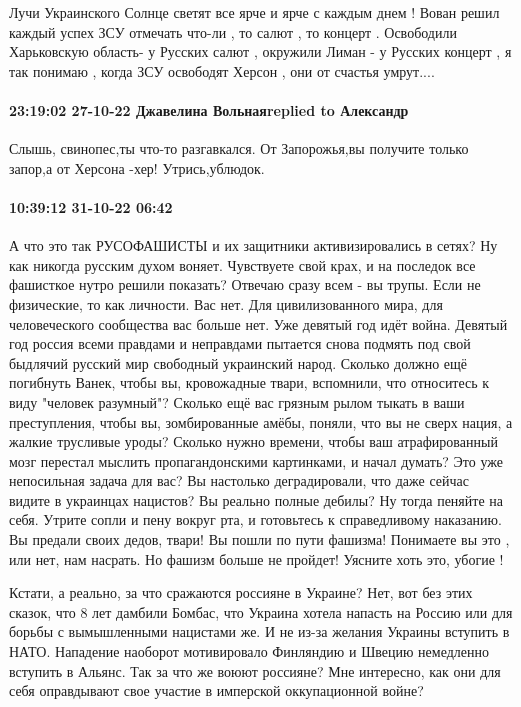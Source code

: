 Лучи Украинского  Солнце   светят все ярче и ярче с каждым днем ! Вован решил
каждый успех ЗСУ отмечать что-ли , то салют , то концерт . Освободили
Харьковскую область- у Русских  салют , окружили Лиман - у Русских  концерт , я
так понимаю ,  когда ЗСУ освободят Херсон , они от счастья умрут....

\paragraph{23:19:02 27-10-22 Джавелина Вольнаяreplied to Александр}

Слышь, свинопес,ты что-то разгавкался. От Запорожья,вы получите только запор,а
от Херсона -хер! Утрись,ублюдок.

\paragraph{10:39:12 31-10-22 06:42}

А что это так РУСОФАШИСТЫ и их защитники активизировались в сетях?
Ну как никогда русским духом воняет. Чувствуете свой крах, и на последок все фашисткое нутро решили показать?
Отвечаю сразу всем - вы трупы. Если не физические, то как личности. Вас нет.
Для цивилизованного мира, для человеческого сообщества вас больше нет.
Уже девятый год идёт война. Девятый год россия всеми правдами и неправдами пытается снова подмять под свой быдлячий русский мир свободный украинский народ.
Сколько должно ещё погибнуть Ванек, чтобы вы, кровожадные твари, вспомнили, что относитесь к виду "человек разумный"?
Сколько ещё вас грязным рылом тыкать в ваши преступления, чтобы вы, зомбированные амёбы, поняли, что вы не сверх нация, а жалкие трусливые уроды?
Сколько нужно времени, чтобы ваш атрафированный мозг перестал мыслить пропагандонскими картинками, и начал думать?
Это уже непосильная задача для вас?
Вы настолько деградировали, что даже сейчас видите в украинцах нацистов?
Вы реально полные дебилы?
Ну тогда пеняйте на себя.
Утрите сопли и пену вокруг рта, и готовьтесь к справедливому наказанию.
Вы предали своих дедов, твари! Вы пошли по пути фашизма!
Понимаете вы это , или нет, нам насрать.
Но фашизм больше не пройдет! Уясните хоть это, убогие !



Кстати, а реально, за что сражаются россияне в Украине? Нет, вот без этих
сказок, что 8 лет дамбили Бомбас, что Украина хотела напасть на Россию или для
борьбы с вымышленными нацистами же. И не из-за желания Украины вступить в НАТО.
Нападение наоборот мотивировало Финляндию и Швецию немедленно вступить в
Альянс. Так за что же воюют россияне? Мне интересно, как они для себя
оправдывают свое участие в имперской оккупационной войне?


